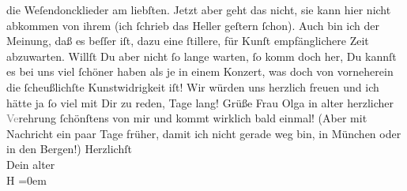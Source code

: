 \begin{ledgroupsized}[t]{13cm}
               die Weſendoncklieder am liebſten. Jetzt aber
               geht das nicht, sie kann hier nicht abkommen von ihrem \label{K_L02204-1v}\label{K_L02204-1h} (ich ſchrieb das Heller geſtern ſchon). Auch bin ich der Meinung, daß es beſſer iſt, dazu
               eine ſtillere, für Kunſt empfänglichere Zeit abzuwarten. Willſt Du aber nicht ſo
               lange warten, ſo komm doch her, Du kannſt es bei uns viel ſchöner haben als je in
               einem Konzert, was doch von vorneherein die ſcheußlichſte Kunstwidrigkeit iſt! Wir
               würden uns herzlich freuen und ich hätte ja ſo viel mit Dir zu reden, Tage lang!\pend
           \pstart
           Grüße Frau Olga in alter herzlicher
                  \textcolor{gray}{Ve}rehrung ſchönſtens von mir und kommt wirklich bald einmal!
               (Aber mit Nachricht ein paar Tage früher, damit ich nicht gerade weg bin, in München oder in den Bergen!)\pend
           \pstart
           Herzlichſt{\\[\baselineskip]}Dein alter{\\[\baselineskip]}\spacefill\mbox{H}\pend
           \leftskip=0em{}
         
         \endnumbering{}\end{ledgroupsized}  \newcommand{\dateiname}{L02204}\newcommand{\titel}{Hermann Bahr an Arthur Schnitzler, 10. 2. 1915}\newcommand{\editorInnen}{ Kurt Ifkovits,  Martin Anton Müller}
      